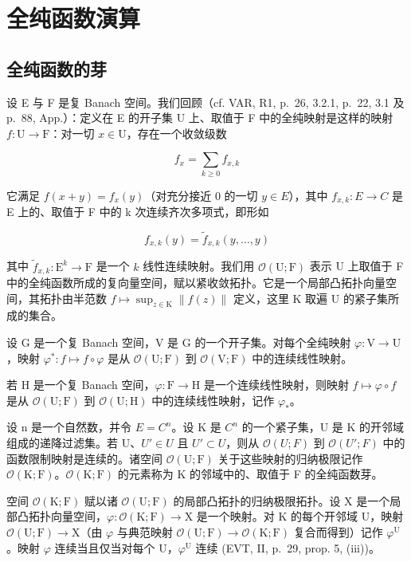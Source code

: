 \section{全纯函数演算}

\subsection{全纯函数的芽}

设 E 与 F 是复 Banach 空间。我们回顾（cf. VAR, R1, p.~26, 3.2.1, p.~22, 3.1 及 p.~88, App.）：定义在 E 的开子集 U 上、取值于 F 中的全纯映射是这样的映射 \(f \colon \mathrm{U} \to \mathrm{F}\)：对一切 \(x \in \mathrm{U}\)，存在一个收敛级数

\[
f _ {x} = \sum_ {k \geqslant 0} f _ {x, k}
\]

它满足 \(f(x + y) = f_x(y)\)（对充分接近 0 的一切 \(y \in E\)），其中 \(f_{x,k} \colon E \to C\) 是 E 上的、取值于 F 中的 k 次连续齐次多项式，即形如

\[
f _ {x, k} (y) = \widetilde {f} _ {x, k} (y, \ldots , y)
\]

其中 \(\widetilde{f}_{x,k}\colon\mathrm{E}^{k}\to\mathrm{F}\) 是一个 \(k\) 线性连续映射。我们用 \(\mathcal{O}(\mathrm{U};\mathrm{F})\) 表示 U 上取值于 F 中的全纯函数所成的复向量空间，赋以紧收敛拓扑。它是一个局部凸拓扑向量空间，其拓扑由半范数 \(f\mapsto\sup_{z\in\mathrm{K}}\|f(z)\|\) 定义，这里 K 取遍 U 的紧子集所成的集合。

设 G 是一个复 Banach 空间，V 是 G 的一个开子集。对每个全纯映射 \(\varphi\colon\mathrm{V}\to\mathrm{U}\)，映射 \(\varphi^{*}\colon f\mapsto f\circ\varphi\) 是从 \(\mathcal{O}(\mathrm{U};\mathrm{F})\) 到 \(\mathcal{O}(\mathrm{V};\mathrm{F})\) 中的连续线性映射。

若 H 是一个复 Banach 空间，\(\varphi\colon\mathrm{F}\to\mathrm{H}\) 是一个连续线性映射，则映射 \(f\mapsto\varphi\circ f\) 是从 \(\mathcal{O}(\mathrm{U};\mathrm{F})\) 到 \(\mathcal{O}(\mathrm{U};\mathrm{H})\) 中的连续线性映射，记作 \(\varphi_{*}\)。

设 n 是一个自然数，并令 \(E = C^{n}\)。设 K 是 \(C^{n}\) 的一个紧子集，U 是 K 的开邻域组成的递降过滤集。若 U、\(U' \in U\) 且 \(U' \subset U\)，则从 \(\mathcal{O}(U; F)\) 到 \(\mathcal{O}(U'; F)\) 中的函数限制映射是连续的。诸空间 \(\mathcal{O}(\mathrm{U};\mathrm{F})\) 关于这些映射的归纳极限记作 \(\mathcal{O}(\mathrm{K};\mathrm{F})\)。\(\mathcal{O}(\mathrm{K};\mathrm{F})\) 的元素称为 K 的邻域中的、取值于 F 的全纯函数芽。

空间 \(\mathcal{O}(\mathrm{K};\mathrm{F})\) 赋以诸 \(\mathcal{O}(\mathrm{U};\mathrm{F})\) 的局部凸拓扑的归纳极限拓扑。设 X 是一个局部凸拓扑向量空间，\(\varphi\colon\mathcal{O}(\mathrm{K};\mathrm{F})\to\mathrm{X}\) 是一个映射。对 K 的每个开邻域 U，映射 \(\mathcal{O}(\mathrm{U};\mathrm{F})\to\mathrm{X}\)（由 \(\varphi\) 与典范映射 \(\mathcal{O}(\mathrm{U};\mathrm{F})\to\mathcal{O}(\mathrm{K};\mathrm{F})\) 复合而得到）记作 \(\varphi^{\mathrm{U}}\)。映射 \(\varphi\) 连续当且仅当对每个 U，\(\varphi^{\mathrm{U}}\) 连续 (EVT, II, p.~29, prop. 5, (iii))。

